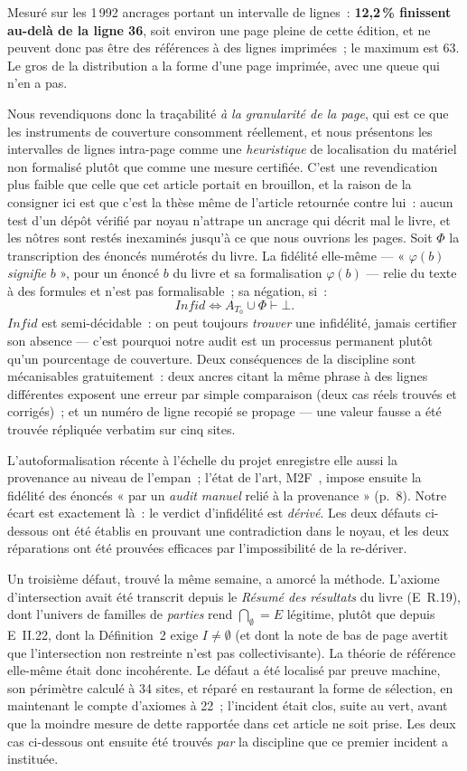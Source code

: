 \documentclass[11pt]{article}
\theoremstyle{remark}\newtheorem{example}{Exemple}
\begin{document}
Mesuré sur les 1\,992 ancrages portant un intervalle de lignes~: \textbf{12,2\,\%
finissent au-delà de la ligne 36}, soit environ une page pleine de cette édition, et ne
peuvent donc pas être des références à des lignes imprimées~; le maximum est 63. Le gros
de la distribution a la forme d'une page imprimée, avec une queue qui n'en a pas.

Nous revendiquons donc la traçabilité \emph{à la granularité de la page}, qui est ce que
les instruments de couverture consomment réellement, et nous présentons les intervalles
de lignes intra-page comme une \emph{heuristique} de localisation du matériel non
formalisé plutôt que comme une mesure certifiée. C'est une revendication plus faible que
celle que cet article portait en brouillon, et la raison de la consigner ici est que
c'est la thèse même de l'article retournée contre lui~: aucun test d'un dépôt vérifié par
noyau n'attrape un ancrage qui décrit mal le livre, et les nôtres sont restés inexaminés
jusqu'à ce que nous ouvrions les pages. Soit $\Phi$ la transcription des énoncés numérotés du livre. La fidélité
elle-même --- « $\varphi(b)$ \emph{signifie} $b$ », pour un énoncé $b$ du livre et sa
formalisation $\varphi(b)$ --- relie du texte à des formules et
n'est pas formalisable~; sa négation, si~:
\[
\mathit{Infid} \iff A_{T_0} \cup \Phi \vdash \bot .
\]
$\mathit{Infid}$ est semi-décidable~: on peut toujours \emph{trouver} une infidélité,
jamais certifier son absence --- c'est pourquoi notre audit est un processus permanent
plutôt qu'un pourcentage de couverture. Deux conséquences de la discipline sont
mécanisables gratuitement~: deux ancres citant la même phrase à des lignes différentes
exposent une erreur par simple comparaison (deux cas réels trouvés et corrigés)~; et un
numéro de ligne recopié se propage --- une valeur fausse a été trouvée répliquée
verbatim sur cinq sites.

L'autoformalisation récente à l'échelle du projet enregistre elle aussi la provenance
au niveau de l'empan~; l'état de l'art, M2F~\cite{m2f2026}, impose ensuite la fidélité
des énoncés « par un \emph{audit manuel} relié à la provenance » (p.~8). Notre écart
est exactement là~: le verdict d'infidélité est \emph{dérivé}. Les deux défauts
ci-dessous ont été établis en prouvant une contradiction dans le noyau, et les deux
réparations ont été prouvées efficaces par l'impossibilité de la re-dériver.

Un troisième défaut, trouvé la même semaine, a amorcé la méthode. L'axiome
d'intersection avait été transcrit depuis le \emph{Résumé des résultats} du livre
(E~R.19), dont l'univers de familles de \emph{parties} rend $\bigcap_{\emptyset} = E$
légitime, plutôt que depuis E~II.22, dont la Définition~2 exige $I \neq \emptyset$ (et
dont la note de bas de page avertit que l'intersection non restreinte n'est pas
collectivisante). La théorie de référence elle-même était donc
incohérente. Le défaut a été localisé par preuve machine, son périmètre calculé à
34 sites, et réparé en restaurant la forme de sélection, en maintenant le compte
d'axiomes à 22~; l'incident était clos, suite au vert, avant que la moindre mesure de
dette rapportée dans cet article ne soit prise. Les deux cas ci-dessous ont ensuite été
trouvés \emph{par} la discipline que ce premier incident a instituée.
\end{document}

